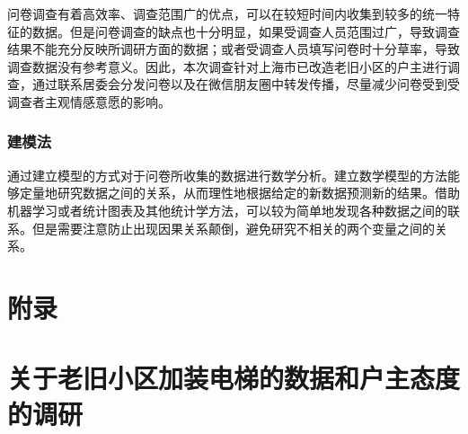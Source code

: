 \documentclass[lang=cn,a4paper]{elegantpaper}
\begin{document}
    问卷调查有着高效率、调查范围广的优点，可以在较短时间内收集到较多的统一特征的数据。但是问卷调查的缺点也十分明显，如果受调查人员范围过广，导致调查结果不能充分反映所调研方面的数据；或者受调查人员填写问卷时十分草率，导致调查数据没有参考意义。因此，本次调查针对上海市已改造老旧小区的户主进行调查，通过联系居委会分发问卷以及在微信朋友圈中转发传播，尽量减少问卷受到受调查者主观情感意愿的影响。

    \subsubsection{建模法}
    通过建立模型的方式对于问卷所收集的数据进行数学分析。建立数学模型的方法能够定量地研究数据之间的关系，从而理性地根据给定的新数据预测新的结果。借助机器学习或者统计图表及其他统计学方法，可以较为简单地发现各种数据之间的联系。但是需要注意防止出现因果关系颠倒，避免研究不相关的两个变量之间的关系。

    \clearpage
    \section*{附录}
    \appendix

    \section{关于老旧小区加装电梯的数据和户主态度的调研}
\end{document}
